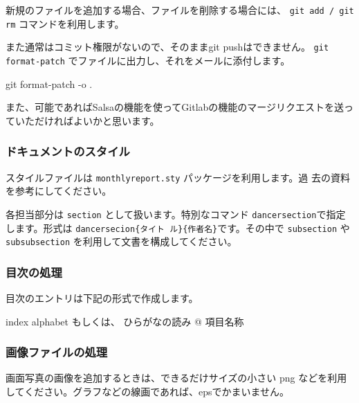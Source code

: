 \documentclass[mingoth,a4paper]{jsarticle}
\begin{document}
新規のファイルを追加する場合、ファイルを削除する場合には、 \texttt{git add /
git rm} コマンドを利用します。

また通常はコミット権限がないので、そのままgit pushはできません。
\texttt{git format-patch} でファイルに出力し、それをメールに添付します。

\begin{commandline}
 git format-patch -o .
\end{commandline}

また、可能であればSalsaの機能を使ってGitlabの機能のマージリクエストを送っ
ていただければよいかと思います。

\subsubsection{ドキュメントのスタイル}

スタイルファイルは \texttt{monthlyreport.sty} パッケージを利用します。過
去の資料を参考にしてください。

\begin{commandline}
\usepackage{monthlyreport} 
\end{commandline}

各担当部分は \texttt{section} として扱います。特別なコマンド
\texttt{dancersection}で指定します。形式は \texttt{dancersecion\{タイト
ル\}\{作者名\}}です。その中で \texttt{subsection} や
\texttt{subsubsection} を利用して文書を構成してください。

\begin{commandline}
 \label{sec:debmtg2007howtoprepare}
\end{commandline}

\subsubsection{目次の処理}

目次のエントリは下記の形式で作成します。
\begin{commandline}
index { alphabet もしくは、 ひらがなの読み @ 項目名称 } 
\end{commandline}

\subsubsection{画像ファイルの処理}

画面写真の画像を追加するときは、できるだけサイズの小さい png などを利用
してください。グラフなどの線画であれば、epsでかまいません。
\end{document}

